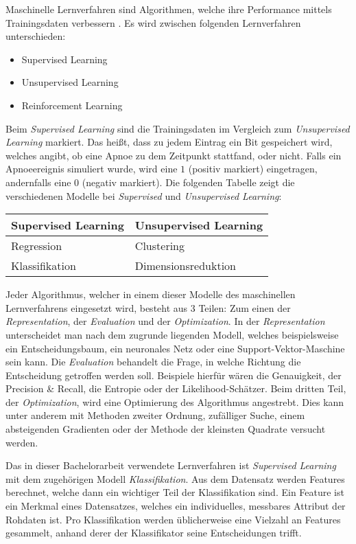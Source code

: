 Maschinelle Lernverfahren sind Algorithmen, welche ihre Performance mittels Trainingsdaten verbessern \cite{neumannMaschineLearningKIT2020}. 
Es wird zwischen folgenden Lernverfahren unterschieden:
\begin{itemize}
    \item Supervised Learning
    \item Unsupervised Learning
    \item Reinforcement Learning
\end{itemize}
Beim \textit{Supervised Learning} sind die Trainingsdaten im Vergleich zum \textit{Unsupervised Learning} markiert.
Das heißt, dass zu jedem Eintrag ein Bit gespeichert wird, welches angibt, ob eine Apnoe zu dem Zeitpunkt stattfand, oder nicht. 
Falls ein Apnoeereignis simuliert wurde, wird eine $1$ ({\glqq positiv markiert\grqq}) eingetragen, andernfalls eine $0$ ({\glqq negativ markiert\grqq}).
Die folgenden Tabelle zeigt die verschiedenen Modelle bei \textit{Supervised} und \textit{Unsupervised Learning}:
\begin{center}
    \begin{tabular}{ | l | l | }
      \hline
      \textbf{Supervised Learning} & \textbf{Unsupervised Learning} \\ \hline
      \hline
      Regression & Clustering \\ \hline
      Klassifikation & Dimensionsreduktion \\
      \hline
    \end{tabular}
\end{center}

Jeder Algorithmus, welcher in einem dieser Modelle des maschinellen Lernverfahrens eingesetzt wird, besteht aus 3 Teilen: Zum einen der \textit{Representation}, der \textit{Evaluation} und der \textit{Optimization}. 
In der \textit{Representation} unterscheidet man nach dem zugrunde liegenden Modell, welches beispielsweise ein Entscheidungsbaum, ein neuronales Netz oder eine Support-Vektor-Maschine sein kann.
Die \textit{Evaluation} behandelt die Frage, in welche Richtung die Entscheidung getroffen werden soll. 
Beispiele hierfür wären die Genauigkeit, der Precision \& Recall, die Entropie oder der Likelihood-Schätzer.
Beim dritten Teil, der \textit{Optimization}, wird eine Optimierung des Algorithmus angestrebt. 
Dies kann unter anderem mit Methoden zweiter Ordnung, zufälliger Suche, einem absteigenden Gradienten oder der Methode der kleinsten Quadrate versucht werden.

Das in dieser Bachelorarbeit verwendete Lernverfahren ist \textit{Supervised Learning} mit dem zugehörigen Modell \textit{Klassifikation}.
Aus dem Datensatz werden Features berechnet, welche dann ein wichtiger Teil der Klassifikation sind.
Ein Feature ist ein Merkmal eines Datensatzes, welches ein individuelles, messbares Attribut der Rohdaten ist.
Pro Klassifikation werden üblicherweise eine Vielzahl an Features gesammelt, anhand derer der Klassifikator seine Entscheidungen trifft.

